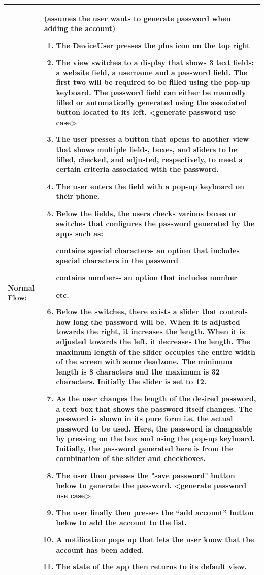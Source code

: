 \documentclass[stu]{apa7}
\newcommand{\nextitem}{\par\hspace*{\labelsep}\textbullet\hspace*{\labelsep}}
\begin{document}
{\begin{xltabular}{\textwidth}{|l|X|}
  Normal Flow: & 
  (assumes the user wants to generate password when adding the account)
  \begin{enumerate}
    \item The DeviceUser presses the plus icon on the top right
    \item The view switches to a display that shows 3 text fields: a website field, a username and a password field. The first two will be required to be filled using the pop-up keyboard. The password field can either be manually filled or automatically generated using the associated button located to its left. <generate password use case>
    \item The user presses a button that opens to another view that shows multiple fields, boxes, and sliders to be filled, checked, and adjusted, respectively, to meet a certain criteria associated with the password.
    \item The user enters the field with a pop-up keyboard on their phone.
    \item Below the fields, the users checks various boxes or switches that configures the password generated by the apps such as:
      \nextitem contains special characters- an option that includes special characters in the password
      \nextitem contains numbers- an option that includes number
      \nextitem etc.
  \item Below the switches, there exists a slider that controls how long the password will be. When it is adjusted towards the right, it increases the length. When it is adjusted towards the left, it decreases the length. The maximum length of the slider occupies the entire width of the screen with some deadzone. The minimum length is 8 characters and the maximum is 32 characters. Initially the slider is set to 12.
  \item As the user changes the length of the desired password, a text box that shows the password itself changes. The password is shown in its pure form i.e. the actual password to be used. Here, the password is changeable by pressing on the box and using the pop-up keyboard. Initially, the password generated here is from the combination of the slider and checkboxes.
  \item The user then presses the "save password" button below to generate the password. <generate password use case>
  \item The user finally then presses the “add account” button below to add the account to the list.
  \item A notification pops up that lets the user know that the account has been added.
  \item The state of the app then returns to its default view.
  \end{enumerate} \\ \hline


\end{xltabular}}
\end{document}
